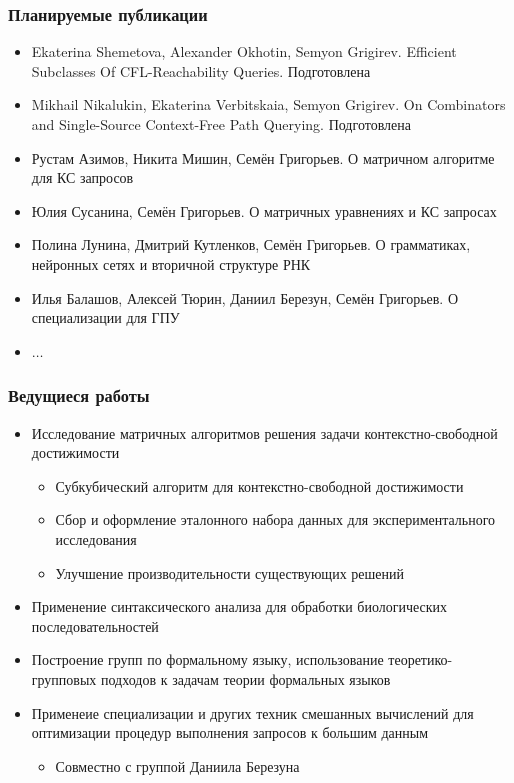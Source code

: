 \documentclass[xcolor=table]{beamer}
\begin{document}
\begin{frame}[fragile]

  \frametitle{Планируемые публикации}
\begin{itemize}
      \item[\faHourglassHalf] Ekaterina Shemetova, Alexander Okhotin, Semyon Grigirev. Efficient Subclasses Of CFL-Reachability Queries. Подготовлена
      \item[\faHourglassHalf] Mikhail Nikalukin, Ekaterina Verbitskaia, Semyon Grigirev. On Combinators and Single-Source Context-Free Path Querying. Подготовлена
      \pause
      \item[\faGears] Рустам Азимов, Никита Мишин, Семён Григорьев. О матричном алгоритме для КС запросов
      \item[\faGears] Юлия Сусанина, Семён Григорьев. О матричных уравнениях и КС запросах
      \item[\faGears] Полина Лунина, Дмитрий Кутленков, Семён Григорьев. О грамматиках, нейронных сетях и вторичной структуре РНК
      \item[\faGears] Илья Балашов, Алексей Тюрин, Даниил Березун, Семён Григорьев. О специализации для ГПУ
      \item[\faGears] $\ldots$
\end{itemize}
\end{frame}

\begin{frame}[fragile]

  \frametitle{Ведущиеся работы}
\begin{itemize}
      \item Исследование матричных алгоритмов решения задачи контекстно-свободной достижимости
      \begin{itemize}
        \item Субкубический алгоритм для контекстно-свободной достижимости
        \item Сбор и оформление эталонного набора данных для экспериментального исследования
        \item Улучшение производительности существующих решений
      \end{itemize}
      \item Применение синтаксического анализа для обработки биологических последовательностей
      \item Построение групп по формальному языку, использование теоретико-групповых подходов к задачам теории формальных языков
      \item Применеие специализации и других техник смешанных вычислений для оптимизации процедур выполнения запросов к большим данным
      \begin{itemize}
        \item Совместно с группой Даниила Березуна
      \end{itemize}
\end{itemize}
\end{frame}
\end{document}

